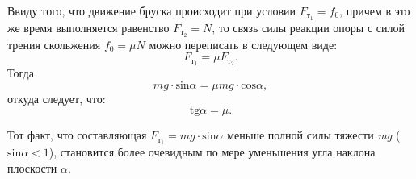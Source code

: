 \documentclass[All.tex]{subfiles}
\begin{document}
Ввиду того, что движение бруска происходит при условии $  F_{\text{т}_1}=f_0 $, причем в это же время выполняется равенство $ F_{\text{т}_2}=N $, то связь силы реакции опоры с силой трения скольжения $ f_0 = \mu N $ можно переписать в следующем виде:
	\begin{equation}\label{friction-4eq4}
F_{\text{т}_1} = \mu F_{\text{т}_2}.
\end{equation}
Тогда
 	\begin{equation}\label{friction-4eq5}
  mg \cdot \text{sin}\alpha = \mu mg \cdot \text{cos}\alpha,
 \end{equation}
откуда следует, что:
 	\begin{equation}\label{friction-4eq6}
\text{tg}\alpha = \mu.
\end{equation}

Тот факт, что составляющая $ F_{\text{т}_1} = mg \cdot\text{sin}\alpha $ меньше полной силы тяжести \textit{mg} ($\text{sin}\alpha < 1$), становится более очевидным по мере уменьшения угла наклона плоскости $ \alpha $.
\end{document}
